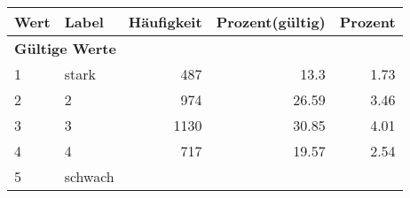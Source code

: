      \begin{longtable}{lXrrr}
     \toprule
     \textbf{Wert} & \textbf{Label} & \textbf{Häufigkeit} & \textbf{Prozent(gültig)} & \textbf{Prozent} \\
     \endhead
     \midrule
     \multicolumn{5}{l}{\textbf{Gültige Werte}}\\

     1 &
     \multicolumn{1}{X}{ stark   } &


       \num{487} &
       \num[round-mode=places,round-precision=2]{13.3} &
         \num[round-mode=places,round-precision=2]{1.73} \\

     2 &
     \multicolumn{1}{X}{ 2   } &


       \num{974} &
       \num[round-mode=places,round-precision=2]{26.59} &
         \num[round-mode=places,round-precision=2]{3.46} \\

     3 &
     \multicolumn{1}{X}{ 3   } &


       \num{1130} &
       \num[round-mode=places,round-precision=2]{30.85} &
         \num[round-mode=places,round-precision=2]{4.01} \\

     4 &
     \multicolumn{1}{X}{ 4   } &


       \num{717} &
       \num[round-mode=places,round-precision=2]{19.57} &
         \num[round-mode=places,round-precision=2]{2.54} \\

     5 &
     \multicolumn{1}{X}{ schwach   } &



\end{longtable}
